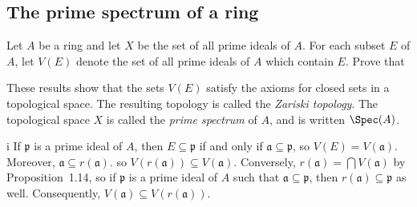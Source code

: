 \subsection{The prime spectrum of a ring}

\begin{exercise}
Let \(A\) be a ring and let \(X\) be the set of all prime ideals of \(A\).
For each subset \(E\) of \(A\), let \(V(E)\) denote the set of all prime ideals of \(A\) which contain \(E\).
Prove that
These results show that the sets \(V(E)\) satisfy the axioms for closed sets in a topological space.
The resulting topology is called the \emph{Zariski topology}.
The topological space \(X\) is called the \emph{prime spectrum} of \(A\), and is written \(\Spec(A)\).
\end{exercise}

\begin{partsolution}{1}{15}{i}
If \(\mathfrak{p}\) is a prime ideal of \(A\), then \(E \subseteq \mathfrak{p}\) if and only if \(\mathfrak{a} \subseteq \mathfrak{p}\), so \(V(E) = V(\mathfrak{a})\).
Moreover, \(\mathfrak{a} \subseteq r(\mathfrak{a})\). so \(V(r(\mathfrak{a})) \subseteq V(\mathfrak{a})\).
Conversely, \(r(\mathfrak{a}) = \bigcap V(\mathfrak{a})\) by Proposition~1.14, so if \(\mathfrak{p}\) is a prime ideal of \(A\) such that \(\mathfrak{a} \subseteq \mathfrak{p}\), then \(r(\mathfrak{a}) \subseteq \mathfrak{p}\) as well.
Consequently, \(V(\mathfrak{a}) \subseteq V(r(\mathfrak{a}))\).
\end{partsolution}

